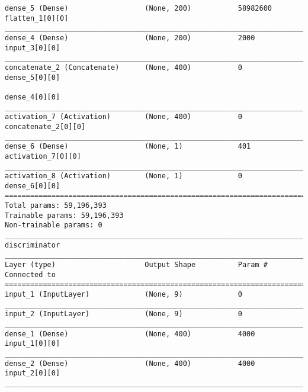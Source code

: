 \documentclass{article}
\begin{document}
\begin{verbatim}
dense_5 (Dense)                  (None, 200)           58982600    flatten_1[0][0]                  
____________________________________________________________________________________________________
dense_4 (Dense)                  (None, 200)           2000        input_3[0][0]                    
____________________________________________________________________________________________________
concatenate_2 (Concatenate)      (None, 400)           0           dense_5[0][0]                    
                                                                   dense_4[0][0]                    
____________________________________________________________________________________________________
activation_7 (Activation)        (None, 400)           0           concatenate_2[0][0]              
____________________________________________________________________________________________________
dense_6 (Dense)                  (None, 1)             401         activation_7[0][0]               
____________________________________________________________________________________________________
activation_8 (Activation)        (None, 1)             0           dense_6[0][0]                    
====================================================================================================
Total params: 59,196,393
Trainable params: 59,196,393
Non-trainable params: 0
____________________________________________________________________________________________________
discriminator
____________________________________________________________________________________________________
Layer (type)                     Output Shape          Param #     Connected to                     
====================================================================================================
input_1 (InputLayer)             (None, 9)             0                                            
____________________________________________________________________________________________________
input_2 (InputLayer)             (None, 9)             0                                            
____________________________________________________________________________________________________
dense_1 (Dense)                  (None, 400)           4000        input_1[0][0]                    
____________________________________________________________________________________________________
dense_2 (Dense)                  (None, 400)           4000        input_2[0][0]                    
____________________________________________________________________________________________________

\end{verbatim}
\end{document}
